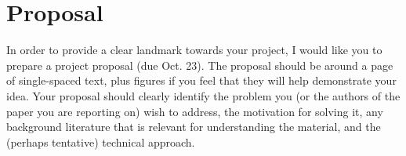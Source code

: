 \documentclass[11pt]{article}
\begin{document}
\section{Proposal}
In order to provide a clear landmark towards your project, I would like you to prepare a project proposal (due Oct. 23).  The proposal should be around a page of single-spaced text, plus figures if you feel that they will help demonstrate your idea.  Your proposal should clearly identify the problem you (or the authors of the paper you are reporting on) wish to address, the motivation for solving it, any background literature that is relevant for understanding the material, and the (perhaps tentative) technical approach.  
\end{document}
